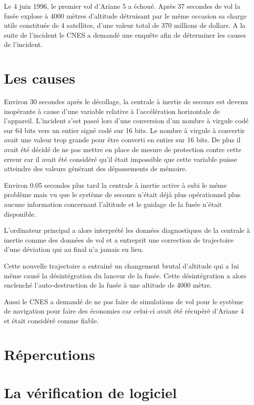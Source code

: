 \documentclass[12pt]{report}
\begin{document}
Le 4 juin 1996, le premier vol d'Ariane 5 a échoué. Après 37 secondes de vol la fusée explose à 4000 mètres d'altitude 
détruisant par le même occasion sa charge utile constituée de 4 satellites, d'une valeur total de 370 millions de dollars.
A la suite de l'incident le CNES a demandé une enquête afin de déterminer les causes de l'incident.

\section{Les causes}

Environ 30 secondes après le décollage, la centrale à inertie de secours est devenu inopérante à cause d'une variable relative à l'accélération horizontale de l'appareil. L'incident s'est passé lors d'une conversion    
d'un nombre à virgule codé sur 64 bits vers un entier signé codé sur 16 bits. Le nombre à virgule à convertir avait une valeur trop grande pour être converti en entier sur 16 bits. De plus il avait été décidé de ne pas mettre en place de mesure de protection contre cette erreur car il avait été considéré qu'il était impossible que cette variable puisse atteindre des valeurs générant des dépassements de mémoire.

Environ 0.05 secondes plus tard la centrale à inertie active à subi le même problème mais vu que le système de secours n'était déjà plus opérationnel plus aucune information concernant l'altitude et le guidage de la fusée n'était disponible.   

L'ordinateur principal a alors interprété les données diagnostiques de la centrale à inertie comme des données de vol et a entreprit une correction de trajectoire d'une déviation qui au final n'a jamais eu lieu.
  
Cette nouvelle trajectoire a entrainé un changement brutal d'altitude qui a lui même causé la désintégration du lanceur de la fusée. Cette désintégration a alors  enclenché l'auto-destruction de la fusée à une altitude de 4000 mètre.

Aussi le \gls{CNES} a demandé de ne pas faire de simulations de vol pour le système de navigation pour faire des économies car celui-ci avait été récupéré d'Ariane 4 et était considéré comme fiable.

\section{Répercutions}
\section{La vérification de logiciel}

\printglossaries
\printbibliography
\end{document}
